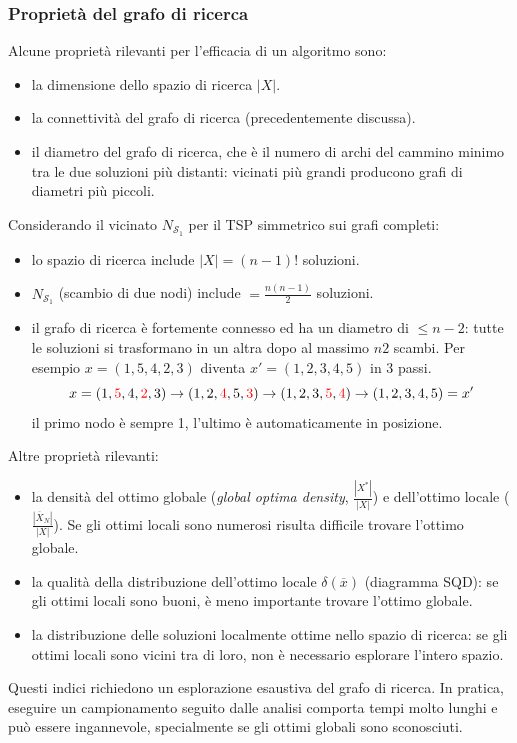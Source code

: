 \documentclass{article}
\begin{document}
\subsubsection{Proprietà del grafo di ricerca}
Alcune proprietà rilevanti per l'efficacia di un algoritmo sono:
\begin{itemize}
    \item la dimensione dello spazio di ricerca $|X|$.
    \item la connettività del grafo di ricerca (precedentemente discussa).
    \item il diametro del grafo di ricerca, che è il numero di archi
          del cammino minimo tra le due soluzioni più distanti: vicinati più grandi producono grafi di diametri più piccoli.
\end{itemize}
Considerando il vicinato $N_{\mathcal{S}_1}$ per il TSP simmetrico sui grafi completi:
\begin{itemize}
    \item lo spazio di ricerca include $|X|=(n-1)!$ soluzioni.
    \item $N_{\mathcal{S}_1}$ (scambio di due nodi) include $=\frac{n(n-1)}{2}$ soluzioni.
    \item il grafo di ricerca è fortemente connesso ed ha un diametro di $\leq n-2$: tutte le
          soluzioni si trasformano in un altra dopo al massimo $n2$ scambi. Per esempio $x=(1,5,4,2,3)$ diventa
          $x'=(1,2,3,4,5)$ in 3 passi.
          $$x=(1,\begingroup \color{red}5\endgroup,4,\begingroup\color{red}2\endgroup,3)\rightarrow(1,2,\begingroup\color{red}4\endgroup,5,\begingroup\color{red}3\endgroup)\rightarrow(1,2,3,\begingroup\color{red}5\endgroup, \begingroup\color{red}4\endgroup)\rightarrow(1,2,3,4,5)=x'$$
          il primo nodo è sempre 1, l'ultimo è automaticamente in posizione.
\end{itemize}
Altre proprietà rilevanti:
\begin{itemize}
    \item la densità del ottimo globale (\textit{global optima density}, $\frac{|X^*|}{|X|}$) e dell'ottimo locale ($\frac{|\overline{X}_N|}{|X|}$).
          Se gli ottimi locali sono numerosi risulta difficile trovare l'ottimo globale.
    \item la qualità della distribuzione dell'ottimo locale $\delta(\overline{x})$ (diagramma SQD):
          se gli ottimi locali sono buoni, è meno importante trovare l'ottimo globale.
    \item la distribuzione delle soluzioni localmente ottime nello spazio di ricerca: se gli ottimi locali
          sono vicini tra di loro, non è necessario esplorare l'intero spazio.
\end{itemize}
Questi indici richiedono un esplorazione esaustiva del grafo di ricerca. In pratica, eseguire un campionamento
seguito dalle analisi comporta tempi molto lunghi e può essere ingannevole, specialmente se gli ottimi globali
sono sconosciuti.
\end{document}
